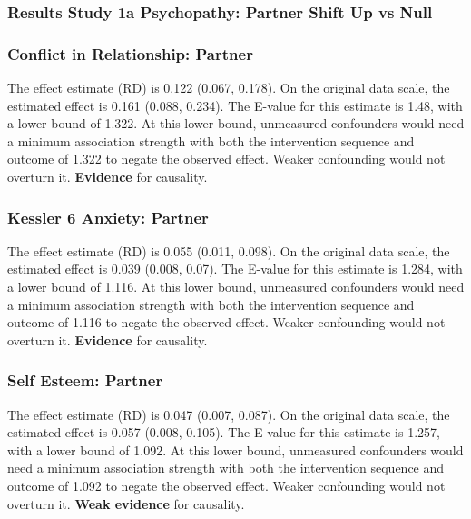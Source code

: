 \documentclass[
  singlecolumn]{article}
\begin{document}
\newpage{}

\subsubsection{Results Study 1a Psychopathy: Partner Shift Up vs
Null}\label{results-study-1a-psychopathy-partner-shift-up-vs-null}

\subsubsection{Conflict in Relationship:
Partner}\label{conflict-in-relationship-partner-7}

The effect estimate (RD) is 0.122 (0.067, 0.178). On the original data
scale, the estimated effect is 0.161 (0.088, 0.234). The E-value for
this estimate is 1.48, with a lower bound of 1.322. At this lower bound,
unmeasured confounders would need a minimum association strength with
both the intervention sequence and outcome of 1.322 to negate the
observed effect. Weaker confounding would not overturn it.
\textbf{Evidence} for causality.

\subsubsection{Kessler 6 Anxiety:
Partner}\label{kessler-6-anxiety-partner-7}

The effect estimate (RD) is 0.055 (0.011, 0.098). On the original data
scale, the estimated effect is 0.039 (0.008, 0.07). The E-value for this
estimate is 1.284, with a lower bound of 1.116. At this lower bound,
unmeasured confounders would need a minimum association strength with
both the intervention sequence and outcome of 1.116 to negate the
observed effect. Weaker confounding would not overturn it.
\textbf{Evidence} for causality.

\subsubsection{Self Esteem: Partner}\label{self-esteem-partner-7}

The effect estimate (RD) is 0.047 (0.007, 0.087). On the original data
scale, the estimated effect is 0.057 (0.008, 0.105). The E-value for
this estimate is 1.257, with a lower bound of 1.092. At this lower
bound, unmeasured confounders would need a minimum association strength
with both the intervention sequence and outcome of 1.092 to negate the
observed effect. Weaker confounding would not overturn it. \textbf{Weak
evidence} for causality.
\end{document}
